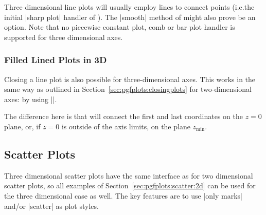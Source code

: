 {Three dimensional line plots will usually employ lines to connect points
(i.e.\@ the initial |sharp plot| handler of \Tikz). The |smooth| method of
\Tikz{} might also prove be an option. Note that no piecewise constant plot,
comb or bar plot handler is supported for three dimensional axes.


\subsubsection{Filled Lined Plots in 3D}
\label{sec:pgfplots:filled:line}

Closing a line plot is also possible for three-dimensional axes. This works in
the same way as outlined in Section~\ref{sec:pgfplots:closingplots} for
two-dimensional axes: by using |\closedcycle|.

\begin{codeexample}[]
\end{codeexample}

The difference here is that \PGFPlots{} will connect the first and last
coordinates on the $z=0$ plane, or, if $z=0$ is outside of the axis limits, on
the plane $z_{\min}$.


\subsection{Scatter Plots}

Three dimensional scatter plots have the same interface as for two dimensional
scatter plots, so all examples of Section~\ref{sec:pgfplots:scatter:2d} can be
used for the three dimensional case as well. The key features are to use
|only marks| and/or |scatter| as plot styles.

}
